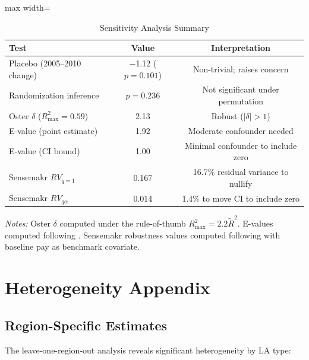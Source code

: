 \documentclass[12pt]{article}
\begin{document}
\begin{table}[H]
\centering
\caption{Sensitivity Analysis Summary}
\label{tab:sensitivity}
\begin{adjustbox}{max width=\textwidth}
\begin{threeparttable}
\begin{tabular}{lcc}
\toprule
Test & Value & Interpretation \\
\midrule
Placebo (2005--2010 change) & $-$1.12 ($p = 0.101$) & Non-trivial; raises concern \\
Randomization inference & $p = 0.236$ & Not significant under permutation \\
Oster $\delta$ ($R^2_{\max} = 0.59$) & 2.13 & Robust ($|\delta| > 1$) \\
E-value (point estimate) & 1.92 & Moderate confounder needed \\
E-value (CI bound) & 1.00 & Minimal confounder to include zero \\
Sensemakr $RV_{q=1}$ & 0.167 & 16.7\% residual variance to nullify \\
Sensemakr $RV_{q\alpha}$ & 0.014 & 1.4\% to move CI to include zero \\
\bottomrule
\end{tabular}
\begin{tablenotes}[flushleft]
\small
\item \textit{Notes:} Oster $\delta$ computed under the rule-of-thumb $R^2_{\max} = 2.2 \tilde{R}^2$. E-values computed following \citet{vanderweele2017sensitivity}. Sensemakr robustness values computed following \citet{cinelli2020making} with baseline pay as benchmark covariate.
\end{tablenotes}
\end{threeparttable}
\end{adjustbox}
\end{table}

\section{Heterogeneity Appendix}\label{app:hetero}

\subsection{Region-Specific Estimates}

The leave-one-region-out analysis reveals significant heterogeneity by LA type:
\end{document}
